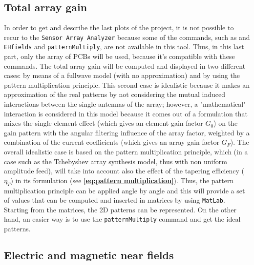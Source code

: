 \documentclass[10pt,a4paper,twocolumn]{article}
\begin{document}
{\subsection*{\selectfont\color{Turquoise}Total array gain}
In order to get and describe the last plots of the project, it is not possible to recur to the \texttt{\color{Mahogany}Sensor Array Analyzer} because some of the commands, such as  and \texttt{\color{Turquoise}EHfields} and \texttt{\color{Turquoise}patternMultiply}, are not available in this tool. Thus, in this last part, only the array of PCBs will be used, because it's compatible with these commands. The total array gain will be computed and displayed in two different cases: by means of a fullwave model (with no approximation) and by using the pattern multiplication principle. This second case is idealistic because it makes an approximation of the real patterns by not considering the mutual induced interactions between the single antennas of the array; however, a "mathematical" interaction is considered in this model because it comes out of a formulation that mixes the single element effect (which gives an element gain factor $G_0$) on the gain pattern with the angular filtering influence of the array factor, weighted by a combination of the current coefficients (which gives an array gain factor $G_F$). The overall idealistic case is based on the pattern multiplication principle, which (in a case such as the Tchebyshev array synthesis model, thus with non uniform amplitude feed), will take into account also the effect of the tapering efficiency ($\eta_T$) in its formulation (see \textbf{\cref{eq:pattern multiplication}}). Thus, the pattern multiplication principle can be applied angle by angle and this will provide a set of values that can be computed and inserted in matrices by using \texttt{\color{BurntOrange}MatLab}. Starting from the matrices, the 2D patterns can be represented. On the other hand, an easier way is to use the \texttt{\color{Turquoise}patternMultiply} command and get the ideal patterns. 


\subsection*{\selectfont\color{Turquoise}Electric and magnetic near fields}



}
\end{document}
